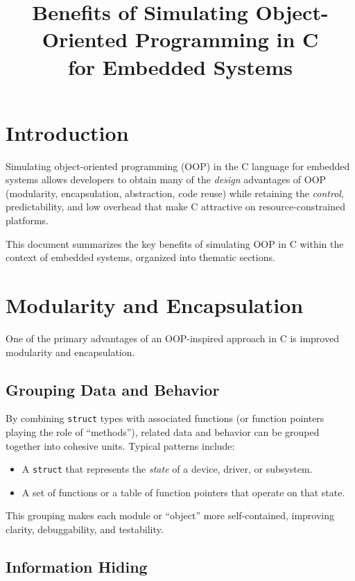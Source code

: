 \documentclass[11pt]{article}
\title{Benefits of Simulating Object-Oriented Programming in C\\for Embedded Systems}
\author{}
\date{}
\begin{document}
\maketitle

\section{Introduction}

Simulating object-oriented programming (OOP) in the C language for embedded systems allows developers to obtain many of the \emph{design} advantages of OOP (modularity, encapsulation, abstraction, code reuse) while retaining the \emph{control}, predictability, and low overhead that make C attractive on resource-constrained platforms.

This document summarizes the key benefits of simulating OOP in C within the context of embedded systems, organized into thematic sections.

\section{Modularity and Encapsulation}

One of the primary advantages of an OOP-inspired approach in C is improved modularity and encapsulation.

\subsection{Grouping Data and Behavior}

By combining \texttt{struct} types with associated functions (or function pointers playing the role of ``methods''), related data and behavior can be grouped together into cohesive units. Typical patterns include:
\begin{itemize}[nosep]
  \item A \texttt{struct} that represents the \emph{state} of a device, driver, or subsystem.
  \item A set of functions or a table of function pointers that operate on that state.
\end{itemize}

This grouping makes each module or ``object'' more self-contained, improving clarity, debuggability, and testability.

\subsection{Information Hiding}
\end{document}
